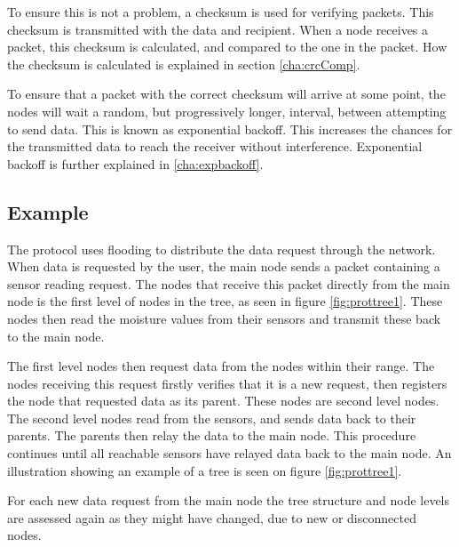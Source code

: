 To ensure this is not a problem, a checksum is used for verifying packets. This checksum is transmitted with the data and recipient. When a node receives a packet, this checksum is calculated, and compared to the one in the packet. How the checksum is calculated is explained in section \ref{cha:crcComp}.

To ensure that a packet with the correct checksum will arrive at some point, the nodes will wait a random, but progressively longer, interval, between attempting to send data. This is known as exponential backoff. This increases the chances for the transmitted data to reach the receiver without interference. Exponential backoff is further explained in \ref{cha:expbackoff}.


\subsection*{Example}
The protocol uses flooding to distribute the data request through the network. 
When data is requested by the user, the main node sends a packet containing a sensor reading request. 
The nodes that receive this packet directly from the main node is the first level of nodes in the tree, as seen in figure \ref{fig:prottree1}. 
These nodes then read the moisture values from their sensors and transmit these back to the main node. 

The first level nodes then request data from the nodes within their range. 
The nodes receiving this request firstly verifies that it is a new request, then registers the node that requested data as its parent. 
These nodes are second level nodes. The second level nodes read from the sensors, and sends data back to their parents. The parents then relay the data to the main node. 
This procedure continues until all reachable sensors have relayed data back to the main node.
An illustration showing an example of a tree is seen on figure \ref{fig:prottree1}.

For each new data request from the main node the tree structure and node levels are assessed again as they might have changed, due to new or disconnected nodes.


